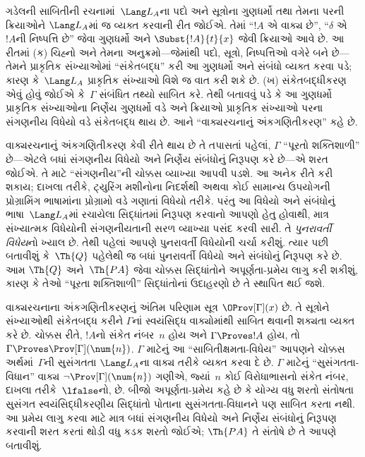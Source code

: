 ગડેલની સાબિતીની રચનામાં~$\Lang L_A$ના
પદો અને સૂત્રોના ગુણધર્મો તથા તેમના
પરની ક્રિયાઓને $\Lang L_A$માં જ વ્યક્ત કરવાની
રીત જોઈએ. તેમાં ``$!A$ એ વાક્ય
છે'', ``$\delta$ એ~$!A$ની
નિષ્પત્તિ છે'' જેવા ગુણધર્મો અને
$\Subst{!A}{t}{x}$ જેવી ક્રિયાઓ આવે છે.
આ રીતમાં (ક) ચિહ્નો અને તેમના અનુક્રમો—જેમાંથી
પદો, સૂત્રો, નિષ્પત્તિઓ વગેરે
બને છે—તેમને પ્રાકૃતિક સંખ્યાઓમાં ``સંકેતબદ્ધ''
કરી આ ગુણધર્મો અને સંબંધો વ્યક્ત કરવા પડે;
કારણ કે~$\Lang L_A$ પ્રાકૃતિક સંખ્યાઓ
વિશે જ વાત કરી શકે છે. (ખ) સંકેતબદ્ધીકરણ
એવું હોવું જોઈએ કે~$\Gamma$ સંબંધિત તથ્યો
સાબિત કરે. તેથી બતાવવું પડે કે આ ગુણધર્મો
પ્રાકૃતિક સંખ્યાઓના નિર્ણેય ગુણધર્મો
વડે અને ક્રિયાઓ પ્રાકૃતિક સંખ્યાઓ પરના
સંગણનીય વિધેયો વડે સંકેતબદ્ધ થાય છે.
આને ``વાક્યરચનાનું અંકગણિતીકરણ'' કહે છે.

વાક્યરચનાનું અંકગણિતીકરણ કેવી રીતે થાય છે
તે તપાસતાં પહેલાં, $\Gamma$ ``પૂરતો
શક્તિશાળી'' છે—એટલે બધાં સંગણનીય વિધેયો
અને નિર્ણેય સંબંધોનું નિરૂપણ
કરે છે—એ શરત જોઈએ. તે માટે
``સંગણનીય''ની ચોક્કસ વ્યાખ્યા આપવી પડશે.
આ અનેક રીતે કરી શકાય; દાખલા તરીકે,
ટ્યુરિંગ મશીનોના નિદર્શથી અથવા કોઈ
સામાન્ય ઉપયોગની પ્રોગ્રામિંગ ભાષામાંના
પ્રોગ્રામો વડે ગણાતાં વિધેયો તરીકે. પરંતુ
આ વિધેયો અને સંબંધોનું ભાષા~$\Lang L_A$માં
રચાયેલા સિદ્ધાંતમાં નિરૂપણ કરવાનો
આપણો હેતુ હોવાથી, માત્ર સંખ્યાત્મક વિધેયોની
સંગણનીયતાની સરળ વ્યાખ્યા પસંદ કરવી સારી.
તે \emph{પુનરાવર્તી વિધેય}નો ખ્યાલ છે.
તેથી પહેલાં આપણે પુનરાવર્તી વિધેયોની ચર્ચા
કરીશું. ત્યાર પછી બતાવીશું કે~$\Th{Q}$
પહેલેથી જ બધાં પુનરાવર્તી વિધેયો અને
સંબંધોનું નિરૂપણ કરે છે. આમ
$\Th{Q}$ અને~$\Th{PA}$ જેવા ચોક્કસ
સિદ્ધાંતોને અપૂર્ણતા-પ્રમેય લાગુ કરી શકીશું,
કારણ કે તેઓ ``પૂરતા શક્તિશાળી'' સિદ્ધાંતોનાં
ઉદાહરણો છે તે સ્થાપિત થઈ જશે.

વાક્યરચનાના અંકગણિતીકરણનું અંતિમ પરિણામ
સૂત્ર $\OProv[\Gamma](x)$ છે. તે
સૂત્રોને સંખ્યાઓથી સંકેતબદ્ધ કરીને
$\Gamma$નાં સ્વયંસિદ્ધ વાક્યોમાંથી સાબિત
થવાની શક્યતા વ્યક્ત કરે છે. ચોક્કસ રીતે,
$!A$નો સંકેત નંબર~$n$ હોય અને
$\Gamma \Proves !A$ હોય, તો
$\Gamma \Proves \Prov[\Gamma](\num{n})$.
$\Gamma$ માટેનું આ ``સાબિતીક્ષમતા-વિધેય''
આપણને ચોક્કસ અર્થમાં~$\Gamma$ની સુસંગતતા
$\Lang L_A$ના વાક્ય તરીકે વ્યક્ત
કરવા દે છે. $\Gamma$ માટેનું
``સુસંગતતા-વિધાન'' વાક્ય
$\lnot \Prov[\Gamma](\num{n})$ ગણીએ,
જ્યાં~$n$ કોઈ વિરોધાભાસનો સંકેત નંબર,
દાખલા તરીકે~$\lfalse$નો, છે. બીજો
અપૂર્ણતા-પ્રમેય કહે છે કે યોગ્ય વધુ શરતો
સંતોષતા સુસંગત સ્વયંસિદ્ધીકરણીય સિદ્ધાંતો પોતાના
સુસંગતતા-વિધાનને પણ સાબિત કરતા નથી.
આ પ્રમેય લાગુ કરવા માટે માત્ર બધાં
સંગણનીય વિધેયો અને નિર્ણેય
સંબંધોનું નિરૂપણ કરવાની શરત કરતાં
થોડી વધુ કડક શરતો જોઈએ; $\Th{PA}$
તે સંતોષે છે તે આપણે બતાવીશું.
\endgroup


